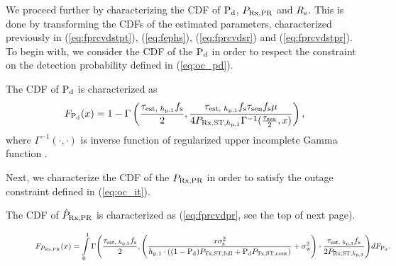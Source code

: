 We proceed further by characterizing the CDF of $\text{P}_{\text{d}}$, $P_{\text{Rx,PR}}$ and $R_{\text{s}}$. This is done by transforming the CDFs of the estimated parameters, characterized previously in (\ref{eq:fprcvdstpt}), (\ref{eq:fephs}), (\ref{eq:fprcvdsr}) and (\ref{eq:fprcvdstpr}). To begin with, we consider the CDF of the $\text{P}_{\text{d}}$ in order to respect the constraint on the detection probability defined in (\ref{eq:oc_pd}). 
\begin{lemma} \label{lm:lem1}
\normalfont
The CDF of $\text{P}_{\text{d}}$ is characterized as\cite{Kaushik16}
\begin{align}
\fpd(x) = 1 - \Gamma \left(\frac{\testpt \fsam}{2}, \frac{\testpt \fsam \tsen \fsam \mu}{4 \prcvdstpt \Gamma^{-1}(\frac{\tsen}{2}, x) } \right), 
\label{eq:fpd}
\end{align}
where $\Gamma^{-1}(\cdot, \cdot)$ is inverse function of regularized upper incomplete Gamma function \cite{grad}.
\end{lemma}
Next, we characterize the CDF of the $P_{\text{Rx,PR}}$ in order to satisfy the outage constraint defined in (\ref{eq:oc_it}). 
\begin{lemma} \label{lm:lem2}
\normalfont 
The CDF of $\hat{P}_{\text{Rx,PR}}$ is characterized as (\ref{eq:fprcvdpr}, see the top of next page).
\begin{figure}
\begin{align}
\fprcvdpr (x) = \int\limits_0^1 \Gamma \Bigg(\frac{\testpr \fsam}{2} , \Bigg( \frac{x \spo}{\hpo \cdot ((1 - \pd) \pfull + \pd \preg)} + \npo  \Bigg) \cdot \frac{\testpr \fsam}{2 \prcvdstpr}  \Bigg) d\fpd. 
\label{eq:fprcvdpr}
\end{align}
\hrulefill
\vspace{-6.0mm}
\end{figure}
\end{lemma}

